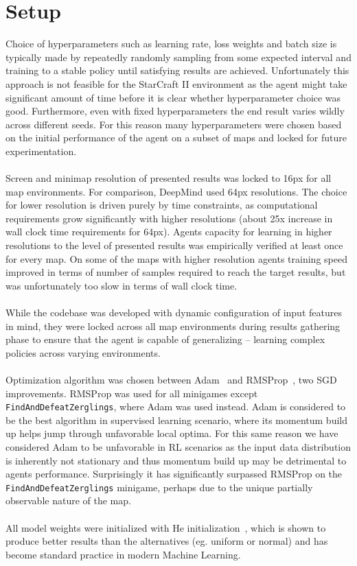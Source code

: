 \section{Setup}

Choice of hyperparameters such as learning rate, loss weights and batch size is typically made by repeatedly randomly sampling from some expected interval and training to a stable policy until satisfying results are achieved. Unfortunately this approach is not feasible for the StarCraft II environment as the agent might take significant amount of time before it is clear whether hyperparameter choice was good. Furthermore, even with fixed hyperparameters the end result varies wildly across different seeds. For this reason many hyperparameters were chosen based on the initial performance of the agent on a subset of maps and locked for future experimentation.
\\\\
Screen and minimap resolution of presented results was locked to 16px for all map environments. For comparison, DeepMind used 64px resolutions. The choice for lower resolution is driven purely by time constraints, as computational requirements grow significantly with higher resolutions (about 25x increase in wall clock time requirements for 64px). Agents capacity for learning in higher resolutions to the level of presented results was empirically verified at least once for every map. On some of the maps with higher resolution agents training speed improved in terms of number of samples required to reach the target results, but was unfortunately too slow in terms of wall clock time.
\\\\
While the codebase was developed with dynamic configuration of input features in mind, they were locked across all map environments during results gathering phase to ensure that the agent is capable of generalizing -- learning complex policies across varying environments.
\\\\
Optimization algorithm was chosen between Adam~\cite{Kingma2014} and RMSProp~\cite{Tieleman2012}, two SGD improvements. RMSProp was used for all minigames except \texttt{FindAndDefeatZerglings}, where Adam was used instead. Adam is considered to be the best algorithm in supervised learning scenario, where its momentum build up helps jump through unfavorable local optima. For this same reason we have considered Adam to be unfavorable in RL scenarios as the input data distribution is inherently not stationary and thus momentum build up may be detrimental to agents performance. Surprisingly it has significantly surpassed RMSProp on the \texttt{FindAndDefeatZerglings} minigame, perhaps due to the unique partially observable nature of the map.
\\\\
All model weights were initialized with He initialization~\cite{He2015}, which is shown to produce better results than the alternatives (eg. uniform or normal) and has become standard practice in modern Machine Learning. 

